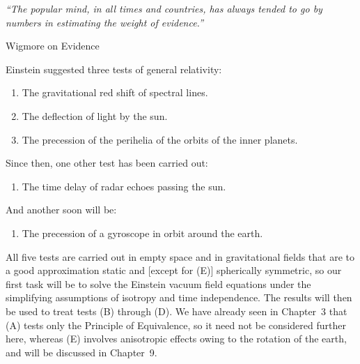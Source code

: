 
\begin{flushright}
\begin{minipage}{0.42\textwidth}
\itshape
``The popular mind, in all times and countries, has always tended to go by
numbers in estimating the weight of evidence.''\par
\raggedleft Wigmore on Evidence
\end{minipage}
\end{flushright}

Einstein suggested three tests of general relativity:
\begin{enumerate}
  \item[(A)] The gravitational red shift of spectral lines.
  \item[(B)] The deflection of light by the sun.
  \item[(C)] The precession of the perihelia of the orbits of the inner
  planets.
\end{enumerate}
Since then, one other test has been carried out:
\begin{enumerate}
  \item[(D)] The time delay of radar echoes passing the sun.
\end{enumerate}
And another soon will be:
\begin{enumerate}
  \item[(E)] The precession of a gyroscope in orbit around the earth.
\end{enumerate}

All five tests are carried out in empty space and in gravitational fields
that are to a good approximation static and [except for (E)] spherically
symmetric, so our first task will be to solve the Einstein vacuum field
equations under the simplifying assumptions of isotropy and time
independence. The results will then be used to treat tests (B) through (D).
We have already seen in Chapter~3 that (A) tests only the Principle of
Equivalence, so it need not be considered further here, whereas (E) involves
anisotropic effects owing to the rotation of the earth, and will be discussed
in Chapter~9.
